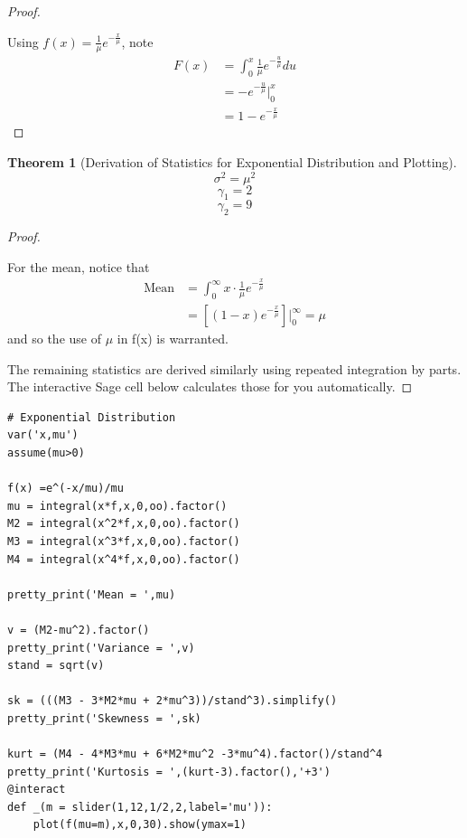 \documentclass[10pt,]{book}
\theoremstyle{plain}
\newtheorem{theorem}{Theorem}[section]
\theoremstyle{definition}
\theoremstyle{definition}
\theoremstyle{definition}
\numberwithin{equation}{section}
\begin{document}
\begin{proof}\hypertarget{proof-49}{}

	Using \(f(x) = \frac{1}{\mu} e^{-\frac{x}{\mu}}\), note
	\begin{align*}
F(x) & = \int_0^x \frac{1}{\mu} e^{-\frac{u}{\mu}} du\\
 & =  - e^{-\frac{u}{\mu}} \big |_0^x\\
 & = 1 - e^{-\frac{x}{\mu}}
\end{align*}
\end{proof}
\begin{theorem}[{Derivation of Statistics for Exponential Distribution and Plotting}]\label{theorem-51}
\begin{equation*}\sigma^2 = \mu^2\end{equation*}\begin{equation*}\gamma_1 = 2\end{equation*}\begin{equation*}\gamma_2 = 9\end{equation*}\end{theorem}
\begin{proof}\hypertarget{proof-50}{}

	For the mean, notice that
	\begin{align*}
\text{Mean} & = \int_0^{\infty} x \cdot \frac{1}{\mu} e^{-\frac{x}{\mu}} \\
 & = [ (1-x) e^{-\frac{x}{\mu}} ] \big |_0^{\infty} = \mu
\end{align*}
	and so the use of \(\mu\) in f(x) is warranted.
\par

	The remaining statistics are derived similarly using repeated integration by parts. The interactive Sage cell below calculates those for you automatically.
\end{proof}
\par

\begin{lstlisting}[style=sageinput]
# Exponential Distribution
var('x,mu')
assume(mu>0)

f(x) =e^(-x/mu)/mu
mu = integral(x*f,x,0,oo).factor()
M2 = integral(x^2*f,x,0,oo).factor()
M3 = integral(x^3*f,x,0,oo).factor()
M4 = integral(x^4*f,x,0,oo).factor()

pretty_print('Mean = ',mu)

v = (M2-mu^2).factor()
pretty_print('Variance = ',v)
stand = sqrt(v)

sk = (((M3 - 3*M2*mu + 2*mu^3))/stand^3).simplify()
pretty_print('Skewness = ',sk)

kurt = (M4 - 4*M3*mu + 6*M2*mu^2 -3*mu^4).factor()/stand^4
pretty_print('Kurtosis = ',(kurt-3).factor(),'+3')
@interact
def _(m = slider(1,12,1/2,2,label='mu')):
    plot(f(mu=m),x,0,30).show(ymax=1)
\end{lstlisting}
\end{document}

